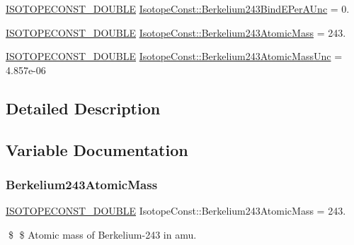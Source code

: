 \begin{DoxyCompactItemize}
\mbox{\hyperlink{group___isotope_const-_macros_ga8f45a7272ce02c0b4c65c44636ed719a}{I\+S\+O\+T\+O\+P\+E\+C\+O\+N\+S\+T\+\_\+\+D\+O\+U\+B\+LE}} \mbox{\hyperlink{group___isotope_const-_berkelium-_bk243_ga27d2a2b755698e394238c8bf50877593}{Isotope\+Const\+::\+Berkelium243\+Bind\+E\+Per\+A\+Unc}} = 0.
\item 
\mbox{\hyperlink{group___isotope_const-_macros_ga8f45a7272ce02c0b4c65c44636ed719a}{I\+S\+O\+T\+O\+P\+E\+C\+O\+N\+S\+T\+\_\+\+D\+O\+U\+B\+LE}} \mbox{\hyperlink{group___isotope_const-_berkelium-_bk243_ga729bcfa5c069a7af9d26794d6db559bc}{Isotope\+Const\+::\+Berkelium243\+Atomic\+Mass}} = 243.
\item 
\mbox{\hyperlink{group___isotope_const-_macros_ga8f45a7272ce02c0b4c65c44636ed719a}{I\+S\+O\+T\+O\+P\+E\+C\+O\+N\+S\+T\+\_\+\+D\+O\+U\+B\+LE}} \mbox{\hyperlink{group___isotope_const-_berkelium-_bk243_ga2d4a484e9cf7a6cdde7f64d1cd482829}{Isotope\+Const\+::\+Berkelium243\+Atomic\+Mass\+Unc}} = 4.\+857e-\/06
\end{DoxyCompactItemize}


\subsection{Detailed Description}


\subsection{Variable Documentation}
\mbox{\label{group___isotope_const-_berkelium-_bk243_ga729bcfa5c069a7af9d26794d6db559bc}} 
\subsubsection{\texorpdfstring{Berkelium243\+Atomic\+Mass}{Berkelium243AtomicMass}}
{\footnotesize\ttfamily \mbox{\hyperlink{group___isotope_const-_macros_ga8f45a7272ce02c0b4c65c44636ed719a}{I\+S\+O\+T\+O\+P\+E\+C\+O\+N\+S\+T\+\_\+\+D\+O\+U\+B\+LE}} Isotope\+Const\+::\+Berkelium243\+Atomic\+Mass = 243.}

\$ \$ Atomic mass of Berkelium-\/243 in amu. \mbox{\label{group___isotope_const-_berkelium-_bk243_ga2d4a484e9cf7a6cdde7f64d1cd482829}} 
